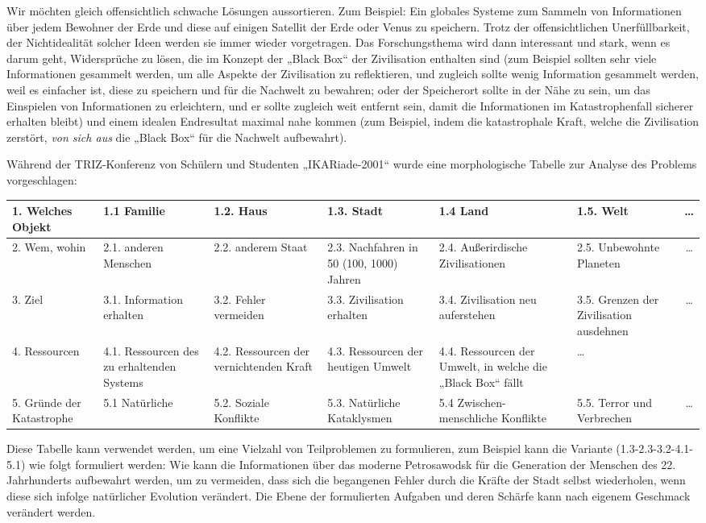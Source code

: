 \documentclass[11pt,a4paper]{article}
\begin{document}
Wir möchten gleich offensichtlich schwache Lösungen aussortieren. Zum
Beispiel: Ein globales Systeme zum Sammeln von Informationen über jedem
Bewohner der Erde und diese auf einigen Satellit der Erde oder Venus zu
speichern. Trotz der offensichtlichen Unerfüllbarkeit, der Nichtidealität
solcher Ideen werden sie immer wieder vorgetragen. Das Forschungsthema wird
dann interessant und stark, wenn es darum geht, Widersprüche zu lösen, die im
Konzept der „Black Box“ der Zivilisation enthalten sind (zum Beispiel sollten
sehr viele Informationen gesammelt werden, um alle Aspekte der Zivilisation zu
reflektieren, und zugleich sollte wenig Information gesammelt werden, weil es
einfacher ist, diese zu speichern und für die Nachwelt zu bewahren; oder der
Speicherort sollte in der Nähe zu sein, um das Einspielen von Informationen zu
erleichtern, und er sollte zugleich weit entfernt sein, damit die
Informationen im Katastrophenfall sicherer erhalten bleibt) und einem idealen
Endresultat maximal nahe kommen (zum Beispiel, indem die katastrophale Kraft,
welche die Zivilisation zerstört, \emph{von sich aus} die „Black Box“ für die
Nachwelt aufbewahrt).

Während der TRIZ-Konferenz von Schülern und Studenten „IKARiade-2001“ wurde
eine morphologische Tabelle zur Analyse des Problems vorgeschlagen:

\begin{center}\small
  \begin{tabular}{|*{6}{>{\raggedright}p{1.9cm}|}c|}\hline
1. Welches Objekt & 1.1 Familie & 1.2. Haus & 1.3. Stadt & 1.4 Land &
1.5. Welt & \ldots \\\hline 
2. Wem, wohin & 2.1. anderen Menschen & 2.2. anderem Staat & 2.3. Nachfahren
in 50 (100, 1000) Jahren & 2.4. Außerirdische Zivilisationen & 2.5. Unbewohnte
Planeten& \ldots \\\hline
3. Ziel & 3.1. Information erhalten & 3.2. Fehler vermeiden &
3.3. Zivilisation erhalten & 3.4. Zivilisation neu auferstehen & 3.5. Grenzen
der Zivilisation ausdehnen& \ldots \\\hline
4. Ressourcen & 4.1. Ressourcen des zu erhaltenden Systems & 4.2. Ressourcen
der vernichtenden Kraft & 4.3. Ressourcen der heutigen Umwelt &
4.4. Ressourcen der Umwelt, in welche die „Black Box“ fällt & \ldots &
\\\hline  
5. Gründe der Katastrophe & 5.1 Natürliche & 5.2. Soziale Konflikte &
5.3. Natürliche Kataklysmen & 5.4 Zwischen- menschliche Konflikte &
5.5. Terror und Verbrechen & \ldots \\\hline
  \end{tabular}
\end{center}
Diese Tabelle kann verwendet werden, um eine Vielzahl von Teilproblemen zu
formulieren, zum Beispiel kann die Variante (1.3-2.3-3.2-4.1-5.1) wie folgt
formuliert werden: Wie kann die Informationen über das moderne Petrosawodsk
für die Generation der Menschen des 22. Jahrhunderts aufbewahrt werden, um zu
vermeiden, dass sich die begangenen Fehler durch die Kräfte der Stadt selbst
wiederholen, wenn diese sich infolge natürlicher Evolution verändert. Die
Ebene der formulierten Aufgaben und deren Schärfe kann nach eigenem Geschmack
verändert werden.
\end{document}
